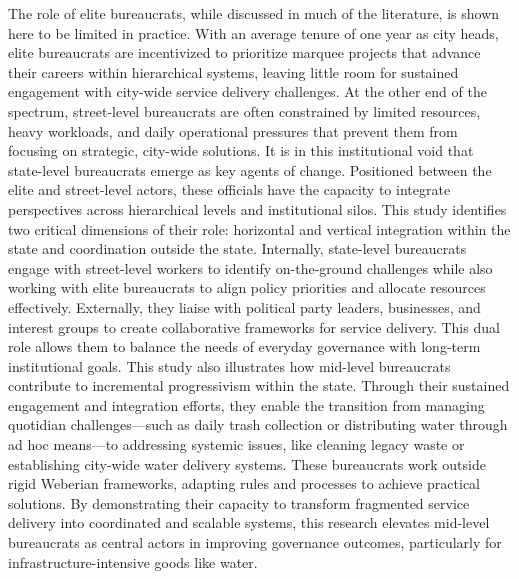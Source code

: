 The role of elite bureaucrats, while discussed in much of the literature, is shown here to be limited in practice. With an average tenure of one year as city heads, elite bureaucrats are incentivized to prioritize marquee projects that advance their careers within hierarchical systems, leaving little room for sustained engagement with city-wide service delivery challenges. At the other end of the spectrum, street-level bureaucrats are often constrained by limited resources, heavy workloads, and daily operational pressures that prevent them from focusing on strategic, city-wide solutions.  It is in this institutional void that state-level bureaucrats emerge as key agents of change. Positioned between the elite and street-level actors, these officials have the capacity to integrate perspectives across hierarchical levels and institutional silos. This study identifies two critical dimensions of their role: horizontal and vertical integration within the state and coordination outside the state. Internally, state-level bureaucrats engage with street-level workers to identify on-the-ground challenges while also working with elite bureaucrats to align policy priorities and allocate resources effectively. Externally, they liaise with political party leaders, businesses, and interest groups to create collaborative frameworks for service delivery. This dual role allows them to balance the needs of everyday governance with long-term institutional goals.
This study also illustrates how mid-level bureaucrats contribute to incremental progressivism within the state.\citep{eduardo_politics_2021} Through their sustained engagement and integration efforts, they enable the transition from managing quotidian challenges—such as daily trash collection or distributing water through ad hoc means—to addressing systemic issues, like cleaning legacy waste or establishing city-wide water delivery systems. These bureaucrats work outside rigid Weberian frameworks, adapting rules and processes to achieve practical solutions. By demonstrating their capacity to transform fragmented service delivery into coordinated and scalable systems, this research elevates mid-level bureaucrats as central actors in improving governance outcomes, particularly for infrastructure-intensive goods like water.

